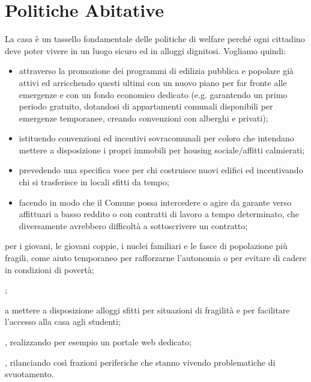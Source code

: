 \section{Politiche Abitative}
La casa è un tassello fondamentale delle politiche di welfare perché ogni cittadino deve poter vivere in un luogo sicuro ed in alloggi dignitosi.
Vogliamo quindi:

\begin{bluebox}
\begin{itemize}
  \item attraverso la promozione dei programmi di edilizia pubblica e popolare già attivi ed arricchendo questi ultimi con un nuovo piano per far fronte alle emergenze e con un fondo economico dedicato (e.g. garantendo un primo periodo gratuito, dotandosi di appartamenti comunali disponibili per emergenze temporanee, creando convenzioni con alberghi e privati);
  \pagebreak
  \item istituendo convenzioni ed incentivi sovracomunali per coloro che intendano mettere a disposizione i propri immobili per housing sociale/affitti calmierati;
  \item prevedendo una specifica voce per chi costruisce nuovi edifici ed incentivando chi si trasferisce in locali sfitti da tempo;
  \item facendo in modo che il Comune possa intercedere o agire da garante verso affittuari a basso reddito o con contratti di lavoro a  tempo determinato, che diversamente avrebbero difficoltà a sottoscrivere un contratto;
\end{itemize}
\end{bluebox}

per i giovani, le giovani coppie, i nuclei familiari e le fasce di popolazione più fragili, come aiuto temporaneo per rafforzarne l'autonomia o per evitare di cadere in condizioni di povertà;

;

 a mettere a disposizione alloggi sfitti per situazioni di fragilità e per facilitare l'accesso alla casa agli studenti;

, realizzando per esempio un portale web dedicato;

, rilanciando così frazioni periferiche che stanno vivendo problematiche di svuotamento.
